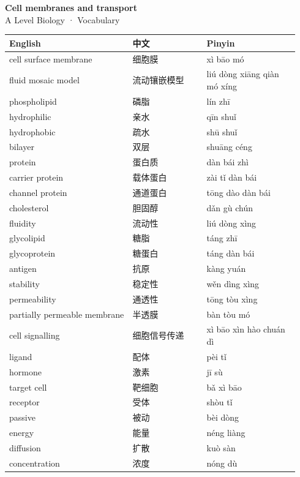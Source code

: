 \documentclass[11pt]{article}
\begin{document}
\begin{center}
  {\LARGE\bfseries Cell membranes and transport}\\[0.35em]
  {\large A Level Biology · Vocabulary}
\end{center}
\vspace{0.6em}

\begin{longtable}{@{}p{0.40\linewidth}p{0.24\linewidth}p{0.30\linewidth}@{}}
\toprule
\textbf{English} & \textbf{中文} & \textbf{Pinyin} \\
\midrule
\endhead
\bottomrule
\endlastfoot
cell surface membrane & 细胞膜 & xì bāo mó \\
fluid mosaic model & 流动镶嵌模型 & liú dòng xiāng qiàn mó xíng \\
phospholipid & 磷脂 & lín zhī \\
hydrophilic & 亲水 & qīn shuǐ \\
hydrophobic & 疏水 & shū shuǐ \\
bilayer & 双层 & shuāng céng \\
protein & 蛋白质 & dàn bái zhì \\
carrier protein & 载体蛋白 & zài tǐ dàn bái \\
channel protein & 通道蛋白 & tōng dào dàn bái \\
cholesterol & 胆固醇 & dǎn gù chún \\
fluidity & 流动性 & liú dòng xìng \\
glycolipid & 糖脂 & táng zhī \\
glycoprotein & 糖蛋白 & táng dàn bái \\
antigen & 抗原 & kàng yuán \\
stability & 稳定性 & wěn dìng xìng \\
permeability & 通透性 & tōng tòu xìng \\
partially permeable membrane & 半透膜 & bàn tòu mó \\
cell signalling & 细胞信号传递 & xì bāo xìn hào chuán dì \\
ligand & 配体 & pèi tǐ \\
hormone & 激素 & jī sù \\
target cell & 靶细胞 & bǎ xì bāo \\
receptor & 受体 & shòu tǐ \\
passive & 被动 & bèi dòng \\
energy & 能量 & néng liàng \\
diffusion & 扩散 & kuò sàn \\
concentration & 浓度 & nóng dù \\

\end{longtable}
\end{document}
